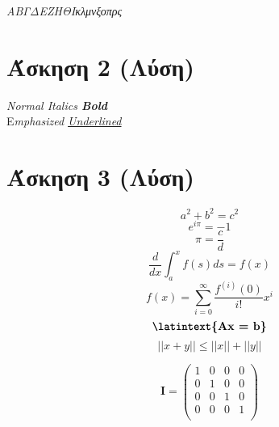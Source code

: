 \documentclass[a4paper,11pt]{article}
\newcommand{\lt}{\latintext}
\begin{document}
	\begin{center}
		\emph{{\tiny Α}{\scriptsize Β}{\footnotesize Γ}{\small Δ}{\normalsize Ε}{\large Ζ}{\Large Η}{\LARGE Θ}{\huge Ι}{\huge κ}{\LARGE λ}{\Large μ}{\large ν}{\normalsize ξ}{\small ο}{\footnotesize π}{\scriptsize ρ}{\tiny ς}}
	\end{center}

\vspace{20pt}

\section{Άσκηση 2 (Λύση)}

	\begin{center}	
		\lt
		\textit{Normal Italics \textbf{Bold\\}}
		{E}\textit{mphasized \underline{Underlined}}
	\end{center}

\section{Άσκηση 3 (Λύση)}
	
	\begin{equation*}
	a^2 + b^2 = c^2
	\end{equation*}
	\begin{equation*}
	e^{i\pi} = -1
	\end{equation*}
	\begin{equation*}
	\pi = \frac{c}{d}
	\end{equation*}
	\begin{equation*}
	\dfrac{d}{dx}\int_{a}^{x} f(s) ds = f(x)
	\end{equation*}
	\begin{equation*}
	f(x) = \sum_{i=0}^{\infty } {\dfrac{f^{(i)}(0)}{i!} x^i }
	\end{equation*}
	\begin{equation*}
	\textbf{\lt{Ax = b}}
	\end{equation*}
	\begin{equation*}
	||{x+y}||\leq||x||+||y||
	\end{equation*}
	
	\quad
	
	\begin{equation}
	\textbf{I} = 
	\begin{pmatrix}
	1&0&0&0 \\
	0&1&0&0 \\
	0&0&1&0 \\
	0&0&0&1 \\
	\end{pmatrix}
	\end{equation}
	
\end{document}
